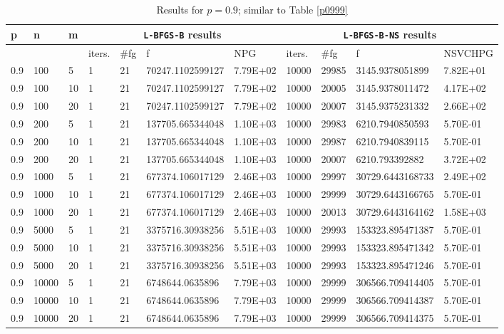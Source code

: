 \begin{table}
  \tiny
  \begin{center}
    \begin{tabular}{|l|l|l|l|l|l|l|l|l|l|l|}
      \hline
      p  & n & m  & \multicolumn{4}{|c|}{\texttt{L-BFGS-B} results} & \multicolumn{4}{|c|}{\texttt{L-BFGS-B-NS} results} \\ \hline
      &  &  & iters. & \#fg & f & NPG & iters. & \#fg & f & NSVCHPG \\ \hline
      0.9 & 100 & 5 & 1 & 21 & 70247.1102599127 & 7.79E+02 & 10000 & 29985 & 3145.9378051899 & 7.82E+01\\
      0.9 & 100 & 10 & 1 & 21 & 70247.1102599127 & 7.79E+02 & 10000 & 20005 & 3145.9378011472 & 4.17E+02\\
      0.9 & 100 & 20 & 1 & 21 & 70247.1102599127 & 7.79E+02 & 10000 & 20007 & 3145.9375231332 & 2.66E+02\\
      0.9 & 200 & 5 & 1 & 21 & 137705.665344048 & 1.10E+03 & 10000 & 29983 & 6210.7940850593 & 5.70E-01\\
      0.9 & 200 & 10 & 1 & 21 & 137705.665344048 & 1.10E+03 & 10000 & 29987 & 6210.7940839115 & 5.70E-01\\
      0.9 & 200 & 20 & 1 & 21 & 137705.665344048 & 1.10E+03 & 10000 & 20007 & 6210.793392882 & 3.72E+02\\
      0.9 & 1000 & 5 & 1 & 21 & 677374.106017129 & 2.46E+03 & 10000 & 29997 & 30729.6443168733 & 2.49E+02\\
      0.9 & 1000 & 10 & 1 & 21 & 677374.106017129 & 2.46E+03 & 10000 & 29999 & 30729.6443166765 & 5.70E-01\\
      0.9 & 1000 & 20 & 1 & 21 & 677374.106017129 & 2.46E+03 & 10000 & 20013 & 30729.6443164162 & 1.58E+03\\
      0.9 & 5000 & 5 & 1 & 21 & 3375716.30938256 & 5.51E+03 & 10000 & 29993 & 153323.895471387 & 5.70E-01\\
      0.9 & 5000 & 10 & 1 & 21 & 3375716.30938256 & 5.51E+03 & 10000 & 29993 & 153323.895471342 & 5.70E-01\\
      0.9 & 5000 & 20 & 1 & 21 & 3375716.30938256 & 5.51E+03 & 10000 & 29993 & 153323.895471246 & 5.70E-01\\
      0.9 & 10000 & 5 & 1 & 21 & 6748644.0635896 & 7.79E+03 & 10000 & 29999 & 306566.709414405 & 5.70E-01\\
      0.9 & 10000 & 10 & 1 & 21 & 6748644.0635896 & 7.79E+03 & 10000 & 29999 & 306566.709414387 & 5.70E-01\\
      0.9 & 10000 & 20 & 1 & 21 & 6748644.0635896 & 7.79E+03 & 10000 & 29999 & 306566.709414375 & 5.70E-01\\
      \hline
    \end{tabular}
    \caption[A value where \texttt{L-BFGS-B-NS} is supposed to fail. $p = 0.9$]{Results for $p = 0.9$; similar to Table \ref{p0999}}
    \label{p09}
  \end{center}
\end{table}

